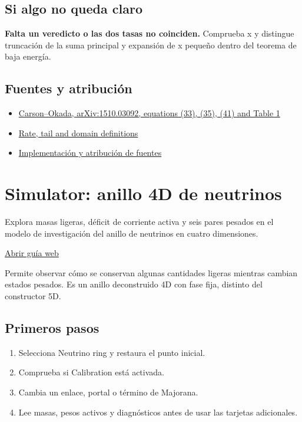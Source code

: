 \documentclass[11pt,a4paper]{article}
\begin{document}
\subsection*{Si algo no queda claro}
\textbf{Falta un veredicto o las dos tasas no coinciden.} Comprueba x y distingue truncación de la suma principal y expansión de x pequeño dentro del teorema de baja energía.

\subsection*{Fuentes y atribución}
\begin{itemize}
\item \href{https://arxiv.org/abs/1510.03092}{Carson--Okada, arXiv:1510.03092, equations (33), (35), (41) and Table 1}
\item \href{https://github.com/karlesmarin/ghu-lab/blob/main/docs/diagnostics.md}{Rate, tail and domain definitions}
\item \href{https://github.com/karlesmarin/ghu-lab/blob/main/src/modules/higgs_diagnostics.mjs}{Implementación y atribución de fuentes}
\end{itemize}
\section{Simulator: anillo 4D de neutrinos}
Explora masas ligeras, déficit de corriente activa y seis pares pesados en el modelo de investigación del anillo de neutrinos en cuatro dimensiones.

\href{https://karlesmarin.github.io/ghu-explorer/guide/es/simulator-neutrino/index.html}{Abrir guía web}

Permite observar cómo se conservan algunas cantidades ligeras mientras cambian estados pesados. Es un anillo deconstruido 4D con fase fija, distinto del constructor 5D.
\subsection*{Primeros pasos}
\begin{enumerate}
\item Selecciona Neutrino ring y restaura el punto inicial.
\item Comprueba si Calibration está activada.
\item Cambia un enlace, portal o término de Majorana.
\item Lee masas, pesos activos y diagnósticos antes de usar las tarjetas adicionales.
\end{enumerate}
\end{document}
